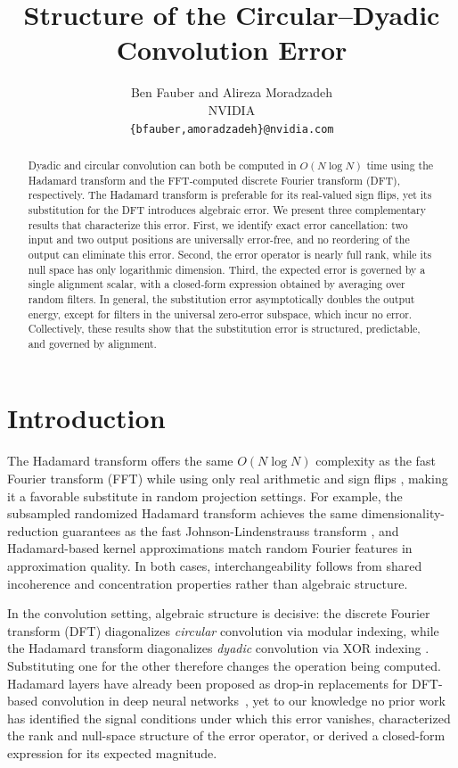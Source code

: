 \documentclass[11pt]{article}
\title{Structure of the Circular--Dyadic Convolution Error}
\author{%
  Ben Fauber and Alireza Moradzadeh \\
  NVIDIA \\
  \texttt{\{bfauber,amoradzadeh\}@nvidia.com}
}
\date{}
\begin{document}
\maketitle


\begin{abstract}
Dyadic and circular convolution can both be computed in $O(N\log N)$ time using the Hadamard transform and the FFT-computed discrete Fourier transform (DFT), respectively. The Hadamard transform is preferable for its real-valued sign flips, yet its substitution for the DFT introduces algebraic error. We present three complementary results that characterize this error. First, we identify exact error cancellation: two input and two output positions are universally error-free, and no reordering of the output can eliminate this error. Second, the error operator is nearly full rank, while its null space has only logarithmic dimension. Third, the expected error is governed by a single alignment scalar, with a closed‑form expression obtained by averaging over random filters. In general, the substitution error asymptotically doubles the output energy, except for filters in the universal zero‑error subspace, which incur no error. Collectively, these results show that the substitution error is structured, predictable, and governed by alignment.
\end{abstract}

\section{Introduction}
\label{sec:intro}

The Hadamard transform offers the same $O(N\log N)$ complexity as the fast Fourier transform (FFT) while using only real arithmetic and sign flips \cite{beauchamp1975walsh, cooley1965algorithm}, making it a favorable substitute in random projection settings. For example, the subsampled randomized Hadamard transform \cite{tropp2011improvedanalysissubsampledrandomized, doi:10.1137/100810447} achieves the same dimensionality-reduction guarantees as the fast Johnson-Lindenstrauss transform \cite{ailonchazelle2006fjlt}, and Hadamard-based kernel approximations \cite{cherapanamjeri2022uniformapproximationsrandomizedhadamard} match random Fourier features \cite{NIPS2007_013a006f} in approximation quality. In both cases, interchangeability follows from shared incoherence and concentration properties rather than algebraic structure.

In the convolution setting, algebraic structure is decisive: the discrete Fourier transform (DFT) diagonalizes \emph{circular} convolution via modular indexing, while the Hadamard transform diagonalizes \emph{dyadic} convolution via XOR indexing \cite{Terras_1999}. Substituting one for the other therefore changes the operation being computed. Hadamard layers have already been proposed as drop-in replacements for DFT-based convolution in deep neural networks~\cite{pan2021fast, pan2022block, pan2023htlayer}, yet to our knowledge no prior work has identified the signal conditions under which this error vanishes, characterized the rank and null-space structure of the error operator, or derived a closed-form expression for its expected magnitude.
\end{document}
